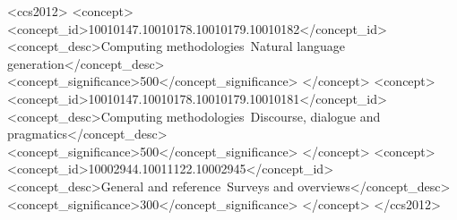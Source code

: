 \documentclass[manuscript]{acmart}
\begin{document}
\begin{CCSXML}
	<ccs2012>
	<concept>
	<concept_id>10010147.10010178.10010179.10010182</concept_id>
	<concept_desc>Computing methodologies~Natural language generation</concept_desc>
	<concept_significance>500</concept_significance>
	</concept>
	<concept>
	<concept_id>10010147.10010178.10010179.10010181</concept_id>
	<concept_desc>Computing methodologies~Discourse, dialogue and pragmatics</concept_desc>
	<concept_significance>500</concept_significance>
	</concept>
	<concept>
	<concept_id>10002944.10011122.10002945</concept_id>
	<concept_desc>General and reference~Surveys and overviews</concept_desc>
	<concept_significance>300</concept_significance>
	</concept>
	</ccs2012>
\end{CCSXML}




\maketitle









%






\end{document}
